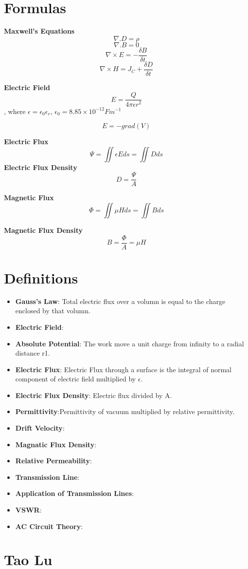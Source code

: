 \documentclass{article}
\begin{document}
\Large
  \section{Formulas}
  \textbf{Maxwell's Equations}
  $$ \nabla .D = \rho $$
  $$\nabla .B = 0$$
  $$\nabla \times E = -\frac{\delta B}{\delta t}$$
  $$\nabla \times H = J_C + \frac{\delta D}{\delta t}$$
  
  \textbf{Electric Field}
  $$E = \frac{Q}{4\pi \epsilon r^2}$$, where $\epsilon = \epsilon_0 \epsilon_r$, $\epsilon_0 = 8.85 \times 10^{-12}Fm^{-1}$
  
  $$E = -grad(V)$$
  
  \textbf{Electric Flux}
  $$\Psi = \iint\epsilon E ds = \iint Dds $$
  \textbf{Electric Flux Density}
  $$D = \frac{\Psi}{A}$$

    
  
  \textbf{Magnetic Flux}
  $$ \Phi = \iint \mu Hds = \iint Bds $$
  
  \textbf{Magnetic Flux Density}
  $$B = \frac{\Phi}{A} = \mu H$$
  
  \section{Definitions}
  \begin{itemize}
  \item \textbf{Gauss's Law}: Total electric flux over a volumn is equal to the charge enclosed by that volumn.
  \item \textbf{Electric Field}:
  \item \textbf{Absolute Potential}: The work move a unit charge from infinity to a radial distance r1. 
  \item \textbf{Electric Flux}: Electric Flux through a surface is the integral of normal component of electric field multiplied by $\epsilon$.
  \item \textbf{Electric Flux Density}: Electric flux divided by A.
  \item \textbf{Permittivity}:Permittivity of vacuum multiplied by relative permittivity.
  \item \textbf{Drift Velocity}:
  \item \textbf{Magnatic Flux Density}:
  \item \textbf{Relative Permeability}:
  \item \textbf{Transmission Line}:
  \item \textbf{Application of Transmission Lines}:
  \item \textbf{VSWR}:
  \item \textbf{AC Circuit Theory}:
  \end{itemize}
  
  
  
  \section{Tao Lu}
\end{document}
